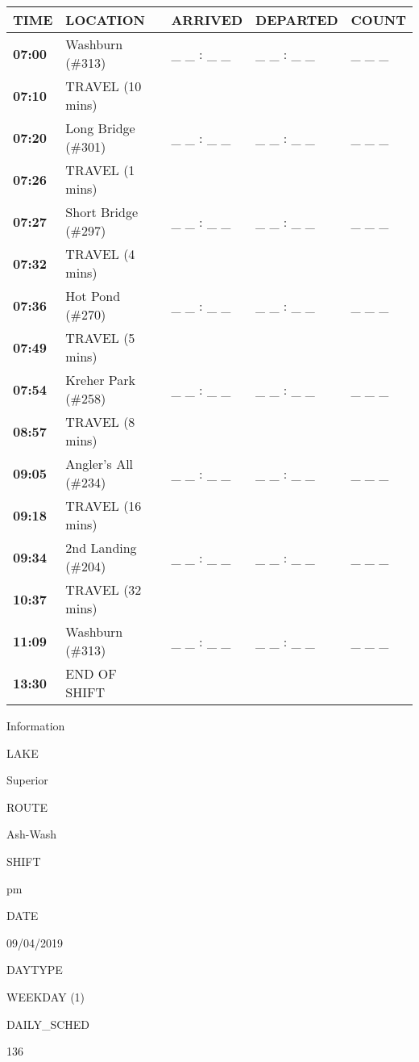 \documentclass[]{article}
\begin{document}
\begin{tabular}{>{\bfseries}lllll}
\toprule
\textbf{TIME} & \textbf{LOCATION} & \textbf{ARRIVED} & \textbf{DEPARTED} & \textbf{COUNT}\\
\midrule
07:00 & Washburn (\#313) & \_ \_ : \_ \_ & \_ \_ : \_ \_ & \_ \_ \_\\
07:10 & TRAVEL (10 mins) &  &  & \\
07:20 & Long Bridge (\#301) & \_ \_ : \_ \_ & \_ \_ : \_ \_ & \_ \_ \_\\
07:26 & TRAVEL (1 mins) &  &  & \\
07:27 & Short Bridge (\#297) & \_ \_ : \_ \_ & \_ \_ : \_ \_ & \_ \_ \_\\
07:32 & TRAVEL (4 mins) &  &  & \\
07:36 & Hot Pond (\#270) & \_ \_ : \_ \_ & \_ \_ : \_ \_ & \_ \_ \_\\
07:49 & TRAVEL (5 mins) &  &  & \\
07:54 & Kreher Park (\#258) & \_ \_ : \_ \_ & \_ \_ : \_ \_ & \_ \_ \_\\
08:57 & TRAVEL (8 mins) &  &  & \\
09:05 & Angler's All (\#234) & \_ \_ : \_ \_ & \_ \_ : \_ \_ & \_ \_ \_\\
09:18 & TRAVEL (16 mins) &  &  & \\
09:34 & 2nd Landing (\#204) & \_ \_ : \_ \_ & \_ \_ : \_ \_ & \_ \_ \_\\
10:37 & TRAVEL (32 mins) &  &  & \\
11:09 & Washburn (\#313) & \_ \_ : \_ \_ & \_ \_ : \_ \_ & \_ \_ \_\\
13:30 & END OF SHIFT &  &  & \\
\bottomrule
\end{tabular}\newpage

Information

LAKE

Superior

ROUTE

Ash-Wash

SHIFT

pm

DATE

09/04/2019

DAYTYPE

WEEKDAY (1)

DAILY\_SCHED

136

\vspace{24pt}
\end{document}
